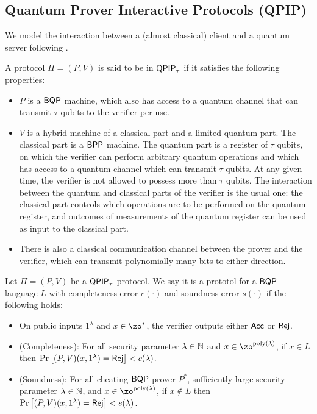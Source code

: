\subsection{Quantum Prover Interactive Protocols (QPIP)}


We model the interaction between a (almost classical) client and a quantum server following \cite{FOCS:Mahadev18a}.

\begin{definition}
	A protocol $\Pi=(P, V)$ is said to be in $\operatorname{\mathsf{QPIP}}_\tau$ if it satisfies the following properties:
	\begin{itemize}
		\item $P$ is a $\operatorname{\mathsf{BQP}}$ machine, which also has access to a quantum channel that can transmit $\tau$ qubits to the verifier per use.
		\item $V$ is a hybrid machine of a classical part and a limited quantum part. The classical part is a $\operatorname{\mathsf{BPP}}$ machine. The quantum part is a register of $\tau$ qubits, on which the verifier can perform arbitrary quantum operations and which has access to a quantum channel which can transmit $\tau$ qubits. At any given time, the verifier is not allowed to possess more than $\tau$ qubits. The interaction between the quantum and classical parts of the verifier is the usual one: the classical part controls which operations are to be performed on the quantum register, and outcomes of measurements of the quantum register can be used as input to the classical part.
		\item There is also a classical communication channel between the prover and the verifier, which can transmit polynomially many bits to either direction.
	\end{itemize}
\end{definition}

\begin{definition}
	Let $\Pi=(P, V)$ be a $\operatorname{\mathsf{QPIP}}_\tau$ protocol.
	We say it is a prototol for a $\operatorname{\mathsf{BQP}}$ language $L$ with completeness error $c(\cdot)$ and soundness error $s(\cdot)$ if the following holds:
\begin{itemize}
		\item On public inputs $1^\lambda$ and $x\in\zo^*$, the verifier outputs either $\mathsf{Acc}$ or $\mathsf{Rej}$.
		\item (Completeness): For all security parameter $\lambda\in\mathbb{N}$ and $x\in\zo^{\poly(\lambda)}$, if $x\in L$ then
		$\Pr\left[(P, V)(x, 1^\lambda)=\mathsf{Rej}\right]<c(\lambda)$.
		\item (Soundness): For all cheating $\operatorname{\mathsf{BQP}}$ prover $P^*$, sufficiently large security parameter $\lambda\in\mathbb{N}$, and $x\in\zo^{\poly(\lambda)}$, if $x \notin L$ then $\Pr\left[(P, V)(x, 1^\lambda)=\mathsf{Rej}\right]<s(\lambda)$.
	\end{itemize}
\end{definition}

